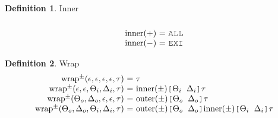 \documentclass[acmsmall]{acmart}
\theoremstyle{definition}
\newtheorem{definition}{Definition}[section]
\begin{document}
\begin{definition}
  Inner
  \hfill
  \small
  \\
  \[\begin{array}[t]{r@{}c@{}lcl}
    \\
    \text{inner}(+) 
    &\ =\ & 
    \J{ALL} 
    \\
    \text{inner}(-) 
    &\ =\ & 
    \J{EXI} 
  \end{array}\]
\end{definition}

\begin{definition}
  Wrap
  \hfill
  \small
  \\
  \[
  \begin{array}[t]{r@{}c@{}lcl}
    \text{wrap}^{\pm}(\epsilon, \epsilon, \epsilon, \epsilon, \tau) 
    &\ =\ & 
    \tau
    \\
    \text{wrap}^{\pm}(\epsilon, \epsilon, \Theta_i, \Delta_i, \tau) 
    &\ =\ & 
    \text{inner}(\pm)\J{[}\Theta_i\J{ }\Delta_i\J{]}\tau
    \\
    \text{wrap}^{\pm}(\Theta_o, \Delta_o, \epsilon, \epsilon, \tau) 
    &\ =\ & 
    \text{outer}(\pm)\J{[}\Theta_o\J{ }\Delta_o\J{]}\tau
    \\
    \text{wrap}^{\pm}(\Theta_o, \Delta_o, \Theta_i, \Delta_i, \tau) 
    &\ =\ & 
    \text{outer}(\pm)\J{[}\Theta_o\J{ }\Delta_o\J{]}
    \text{inner}(\pm)\J{[}\Theta_i\J{ }\Delta_i\J{]}
    \tau
  \end{array}\]
\end{definition}
\end{document}
